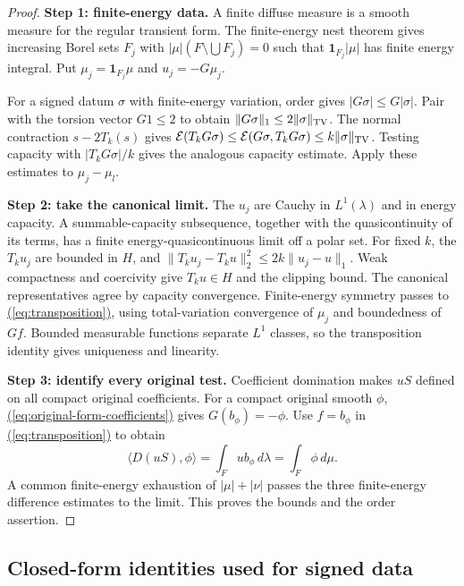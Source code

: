 \documentclass[11pt,reqno]{amsart}
\theoremstyle{definition}
\theoremstyle{remark}
\numberwithin{equation}{section}
\newcommand{\MathEqref}[1]{\begingroup\hypersetup{linkcolor=EquationLink}\hyperref[#1]{(\ref*{#1})}\endgroup}
\begin{document}
\begin{proof}
\textbf{Step 1: finite-energy data.}
A finite diffuse measure is a smooth measure for the regular transient
form. The finite-energy nest theorem
\cite[Lemma 2.1]{KRStructure} gives increasing Borel sets $F_j$ with
$|\mu|(F\setminus\bigcup F_j)=0$ such that
$\mathbf1_{F_j}|\mu|$ has finite energy integral. Put
$\mu_j=\mathbf1_{F_j}\mu$ and $u_j=-G\mu_j$.

For a signed datum $\sigma$ with finite-energy variation, order gives
$|G\sigma|\le G|\sigma|$. Pair with the torsion vector $G1\le2$ to
obtain $\|G\sigma\|_1\le2\|\sigma\|_{\rm TV}$. The normal
contraction $s-2T_k(s)$ gives
$\mathcal E(T_kG\sigma)\le\mathcal E(G\sigma,T_kG\sigma)
\le k\|\sigma\|_{\rm TV}$. Testing capacity with
$|T_kG\sigma|/k$ gives the analogous capacity estimate.
Apply these estimates to $\mu_j-\mu_l$.

\textbf{Step 2: take the canonical limit.}
The $u_j$ are Cauchy in $L^1(\lambda)$ and in energy capacity. A
summable-capacity subsequence, together with the quasicontinuity of
its terms, has a finite energy-quasicontinuous limit off a polar set.
For fixed $k$, the $T_ku_j$ are bounded in $H$, and
$\|T_ku_j-T_ku\|_2^2\le2k\|u_j-u\|_1$. Weak compactness and
coercivity give $T_ku\in H$ and the clipping bound. The canonical
representatives agree by capacity convergence. Finite-energy symmetry
passes to \MathEqref{eq:transposition}, using total-variation
convergence of $\mu_j$ and boundedness of $Gf$.
Bounded measurable functions separate $L^1$ classes, so the
transposition identity gives uniqueness and linearity.

\textbf{Step 3: identify every original test.}
Coefficient domination makes $uS$ defined on all compact original
coefficients. For a compact original smooth $\phi$,
\MathEqref{eq:original-form-coefficients} gives
$G(b_\phi)=-\phi$. Use $f=b_\phi$ in
\MathEqref{eq:transposition} to obtain
\[
 \langle D(uS),\phi\rangle
     =\int_Fu b_\phi\,d\lambda=\int_F\phi\,d\mu.
\]
A common finite-energy exhaustion of $|\mu|+|\nu|$ passes the three
finite-energy difference estimates to the limit. This proves the
bounds and the order assertion.
\end{proof}

\subsection{Closed-form identities used for signed data}
\end{document}
